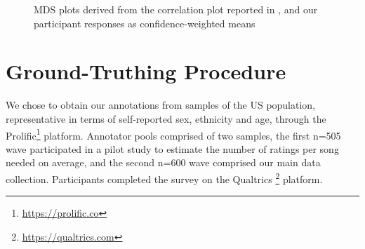 \documentclass{article}
\begin{document}
\begin{figure}
 \centerline{}
 \caption{MDS plots derived from the correlation plot reported in \cite{schwartz2001extending}, and our participant responses as confidence-weighted means}
 \label{fig:mds_plots}
\end{figure}

\section{Ground-Truthing Procedure}\label{sec:groundtruthing}

We chose to obtain our annotations from samples of the US population, representative in terms of self-reported sex, ethnicity and age, through the Prolific\footnote{\url{https://prolific.co}} platform. Annotator pools comprised of two samples, the first n=505 wave participated in a pilot study to estimate the number of ratings per song needed on average, and the second n=600 wave comprised our main data collection. Participants completed the survey on the Qualtrics \footnote{\url{https://qualtrics.com}} platform. 
\end{document}
